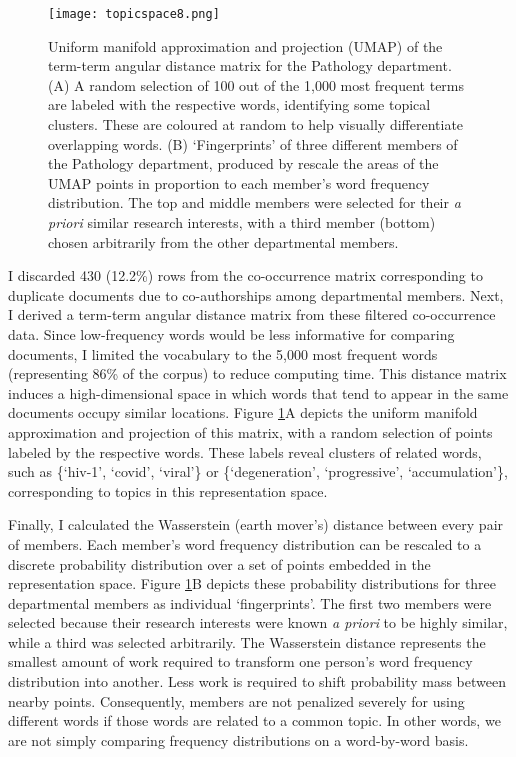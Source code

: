 \documentclass[12pt]{article}
\begin{document}
\begin{figure}[tbp]
\centering
\texttt{[image: topicspace8.png]}
\caption{
Uniform manifold approximation and projection (UMAP) of the term-term angular distance matrix for the Pathology department.
(A) A random selection of 100 out of the 1,000 most frequent terms are labeled with the respective words, identifying some topical clusters.
These are coloured at random to help visually differentiate overlapping words.
(B) `Fingerprints' of three different members of the Pathology department, produced by rescale the areas of the UMAP points in proportion to each member's word frequency distribution.
The top and middle members were selected for their \textit{a priori} similar research interests, with a third member (bottom) chosen arbitrarily from the other departmental members. 
}
\label{fig:topicspace}
\end{figure}


I discarded 430 (12.2\%) rows from the co-occurrence matrix corresponding to duplicate documents due to co-authorships among departmental members.
Next, I derived a term-term angular distance matrix from these filtered co-occurrence data.
Since low-frequency words would be less informative for comparing documents, I limited the vocabulary to the 5,000 most frequent words (representing 86\% of the corpus) to reduce computing time.
This distance matrix induces a high-dimensional space in which words that tend to appear in the same documents occupy similar locations.
Figure \ref{fig:topicspace}A depicts the uniform manifold approximation and projection of this matrix, with a random selection of points labeled by the respective words.
These labels reveal clusters of related words, such as \{`hiv-1', `covid', `viral'\} or \{`degeneration', `progressive', `accumulation'\}, corresponding to topics in this representation space.



Finally, I calculated the Wasserstein (earth mover's) distance between every pair of members.
Each member's word frequency distribution can be rescaled to a discrete probability distribution over a set of points embedded in the representation space.
Figure \ref{fig:topicspace}B depicts these probability distributions for three departmental members as individual `fingerprints'.
The first two members were selected because their research interests were known \textit{a priori} to be highly similar, while a third was selected arbitrarily.
The Wasserstein distance represents the smallest amount of work required to transform one person's word frequency distribution into another.
Less work is required to shift probability mass between nearby points.
Consequently, members are not penalized severely for using different words if those words are related to a common topic.
In other words, we are not simply comparing frequency distributions on a word-by-word basis.
\end{document}
